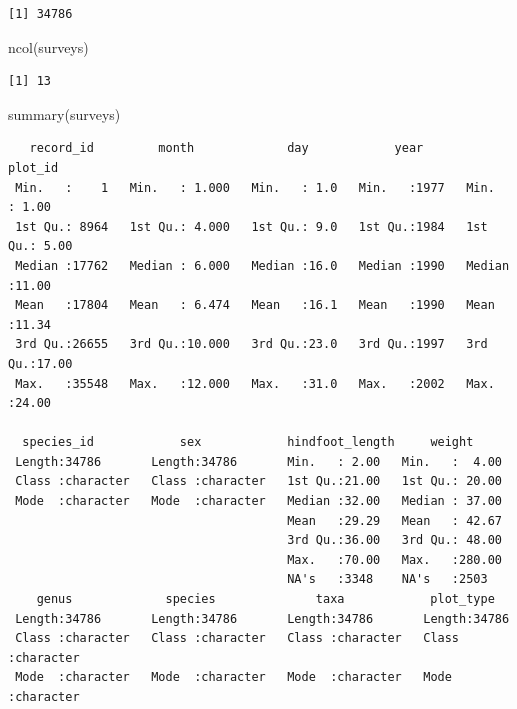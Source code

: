 \documentclass[
  letterpaper,
  DIV=11,
  numbers=noendperiod]{scrreprt}
\newenvironment{Shaded}{\begin{snugshade}}{\end{snugshade}}
\newcommand{\FunctionTok}[1]{\textcolor[rgb]{0.28,0.35,0.67}{#1}}
\newcommand{\NormalTok}[1]{\textcolor[rgb]{0.00,0.23,0.31}{#1}}
\begin{document}
\begin{verbatim}
[1] 34786
\end{verbatim}

\begin{Shaded}
\begin{Highlighting}[]
\FunctionTok{ncol}\NormalTok{(surveys)}
\end{Highlighting}
\end{Shaded}

\begin{verbatim}
[1] 13
\end{verbatim}

\begin{Shaded}
\begin{Highlighting}[]
\FunctionTok{summary}\NormalTok{(surveys)}
\end{Highlighting}
\end{Shaded}

\begin{verbatim}
   record_id         month             day            year         plot_id     
 Min.   :    1   Min.   : 1.000   Min.   : 1.0   Min.   :1977   Min.   : 1.00  
 1st Qu.: 8964   1st Qu.: 4.000   1st Qu.: 9.0   1st Qu.:1984   1st Qu.: 5.00  
 Median :17762   Median : 6.000   Median :16.0   Median :1990   Median :11.00  
 Mean   :17804   Mean   : 6.474   Mean   :16.1   Mean   :1990   Mean   :11.34  
 3rd Qu.:26655   3rd Qu.:10.000   3rd Qu.:23.0   3rd Qu.:1997   3rd Qu.:17.00  
 Max.   :35548   Max.   :12.000   Max.   :31.0   Max.   :2002   Max.   :24.00  
                                                                               
  species_id            sex            hindfoot_length     weight      
 Length:34786       Length:34786       Min.   : 2.00   Min.   :  4.00  
 Class :character   Class :character   1st Qu.:21.00   1st Qu.: 20.00  
 Mode  :character   Mode  :character   Median :32.00   Median : 37.00  
                                       Mean   :29.29   Mean   : 42.67  
                                       3rd Qu.:36.00   3rd Qu.: 48.00  
                                       Max.   :70.00   Max.   :280.00  
                                       NA's   :3348    NA's   :2503    
    genus             species              taxa            plot_type        
 Length:34786       Length:34786       Length:34786       Length:34786      
 Class :character   Class :character   Class :character   Class :character  
 Mode  :character   Mode  :character   Mode  :character   Mode  :character  
                                                                            
                                                                            
                                                                            
                                                                            
\end{verbatim}
\end{document}

